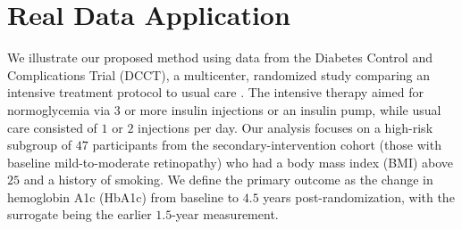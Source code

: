 \documentclass[referee,usenatbib]{biom}
\begin{document}
\section{Real Data Application}\label{sec:real_data_application}


We illustrate our proposed method using data from the Diabetes Control and Complications Trial (DCCT), a multicenter, randomized study comparing an intensive treatment protocol to usual care \citep{dcct1987diabetes,Lachin2021DCCT,diabetes1993effect}. The intensive therapy aimed for normoglycemia via \(3\) or more insulin injections or an insulin pump, while usual care consisted of \(1\) or \(2\) injections per day. Our analysis focuses on a high-risk subgroup of \(47\) participants from the secondary-intervention cohort (those with baseline mild-to-moderate retinopathy) who had a body mass index (BMI) above \(25\) and a history of smoking. We define the primary outcome as the change in hemoglobin A1c (HbA1c) from baseline to \(4.5\) years post-randomization, with the surrogate being the earlier \(1.5\)-year measurement.
\end{document}
